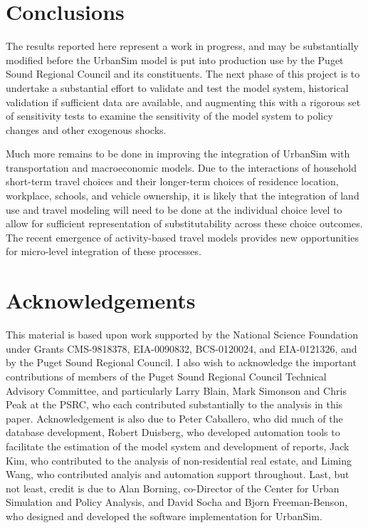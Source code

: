 \section{Conclusions}

The results reported here represent a work in progress, and may be
substantially modified before the UrbanSim model is put into
production use by the Puget Sound Regional Council and its
constituents.  The next phase of this project is to undertake a
substantial effort to validate and test the model system,
historical validation if sufficient data are available, and
augmenting this with a rigorous set of sensitivity tests to
examine the sensitivity of the model system to policy changes and
other exogenous shocks.

Much more remains to be done in improving the integration of
UrbanSim with transportation and macroeconomic models.  Due to the
interactions of household short-term travel choices and their
longer-term choices of residence location, workplace, schools, and
vehicle ownership, it is likely that the integration of land use
and travel modeling will need to be done at the individual choice
level to allow for sufficient representation of substitutability
across these choice outcomes.  The recent emergence of
activity-based travel models provides new opportunities for
micro-level integration of these processes.


\section*{Acknowledgements}

This material is based upon work supported by the National Science
Foundation under Grants CMS-9818378, EIA-0090832, BCS-0120024, and
EIA-0121326, and by the Puget Sound Regional Council.  I also wish
to acknowledge the important contributions of members of the Puget
Sound Regional Council Technical Advisory Committee, and
particularly Larry Blain, Mark Simonson and Chris Peak at the
PSRC, who each contributed substantially to the analysis in this
paper.  Acknowledgement is also due to Peter Caballero, who did
much of the database development, Robert Duisberg, who developed
automation tools to facilitate the estimation of the model system
and development of reports, Jack Kim, who contributed to the
analysis of non-residential real estate, and Liming Wang, who
contributed analyis and automation support throughout.  Last, but
not least, credit is due to Alan Borning, co-Director of the
Center for Urban Simulation and Policy Analysis, and David Socha
and Bjorn Freeman-Benson, who designed and developed the software
implementation for UrbanSim.

